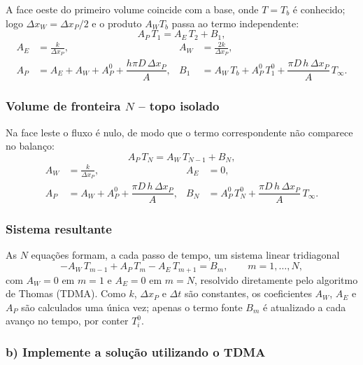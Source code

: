 A face oeste do primeiro volume coincide com a base, onde $T=T_b$ \'e
conhecido; logo $\Delta x_W=\Delta x_P/2$ e o produto $A_W T_b$ passa ao termo independente:
\begin{equation}
  A_P\,T_1=A_E\,T_2+B_1 ,
\end{equation}
\[
\begin{aligned}
  A_E&=\frac{k}{\Delta x_P}, &
  A_W&=\frac{2k}{\Delta x_P}, \\[4pt]
  A_P&=A_E+A_W+A_P^{0}+\dfrac{h\pi D\,\Delta x_P}{A}, &
  B_1&=A_W\,T_b+A_P^{0}\,T_1^{0}+\dfrac{\pi D\,h\,\Delta x_P}{A}\,T_\infty .
\end{aligned}
\]

\subsubsection*{Volume de fronteira $N$ -- topo isolado}

Na face leste o fluxo \'e nulo, de modo que o termo correspondente n\~ao
comparece no balan\c{c}o:
\begin{equation}
  A_P\,T_N=A_W\,T_{N-1}+B_N ,
\end{equation}
\[
\begin{aligned}
  A_W&=\frac{k}{\Delta x_P}, &
  A_E&=0, \\[4pt]
  A_P&=A_W+A_P^{0}+\dfrac{\pi D\,h\,\Delta x_P}{A}, &
  B_N&=A_P^{0}\,T_N^{0}+\dfrac{\pi D\,h\,\Delta x_P}{A}\,T_\infty .
\end{aligned}
\]

\subsubsection*{Sistema resultante}

As $N$ equa\c{c}\~oes formam, a cada passo de tempo, um sistema linear
tridiagonal
\[
  -A_W\,T_{m-1}+A_P\,T_m-A_E\,T_{m+1}=B_m ,\qquad m=1,\dots,N,
\]
com $A_W=0$ em $m=1$ e $A_E=0$ em $m=N$, resolvido diretamente pelo algoritmo
de Thomas (TDMA). Como $k$, $\Delta x_P$ e $\Delta t$ s\~ao constantes, os
coeficientes $A_W$, $A_E$ e $A_P$ s\~ao calculados uma \'unica vez; apenas o
termo fonte $B_m$ \' e atualizado a cada avan\c{c}o no tempo, por conter
$T_i^{0}$.

\vspace{0.5cm}

\subsubsection*{b) Implemente a solução utilizando o TDMA}

